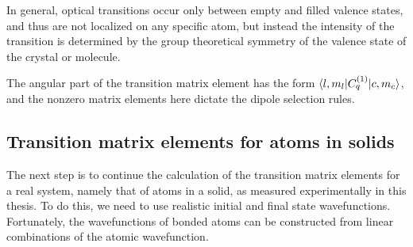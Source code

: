 In general, optical transitions occur only between empty and filled valence states, and thus are not localized on any specific atom, but instead the intensity of the transition is determined by the group theoretical symmetry of the valence state of the crystal or molecule.

The angular part of the transition matrix element has the form $\braket{l,m_l|C_q^{(1)}|c,m_c}$, and the nonzero matrix elements here dictate the dipole selection rules.

\subsection{Transition matrix elements for atoms in solids}

The next step is to continue the calculation of the transition matrix elements for a real system, namely that of atoms in a solid, as measured experimentally in this thesis. To do this, we need to use realistic initial and final state wavefunctions. Fortunately, the wavefunctions of bonded atoms can be constructed from linear combinations of the atomic  wavefunction.

